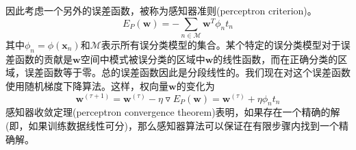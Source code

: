 因此考虑一个另外的误差函数，被称为感知器准则(perceptron criterion)。
\begin{equation}
	E_P(\boldsymbol{w})=-\sum_{n\in \mathcal{M}}\boldsymbol{w}^T\phi_nt_n
\end{equation}
其中$\phi_n=\phi(\boldsymbol{x}_n)$和$\mathcal{M}$表示所有误分类模型的集合。某个特定的误分类模型对于误差函数的贡献是$\boldsymbol{w}$空间中模式被误分类的区域中$\boldsymbol{w}$的线性函数，而在正确分类的区域，误差函数等于零。总的误差函数因此是分段线性的。我们现在对这个误差函数使用随机梯度下降算法。这样，权向量$\boldsymbol{w}$的变化为
\begin{equation}
	\boldsymbol{w}^{(\tau+1)}=\boldsymbol{w}^{(\tau)}-\eta \triangledown E_P(\boldsymbol{w})=\boldsymbol{w}^{(\tau)}+\eta\phi_nt_n
\end{equation}
感知器收敛定理(perceptron convergence theorem)表明，如果存在一个精确的解(即，如果训练数据线性可分)，那么感知器算法可以保证在有限步骤内找到一个精确解。

